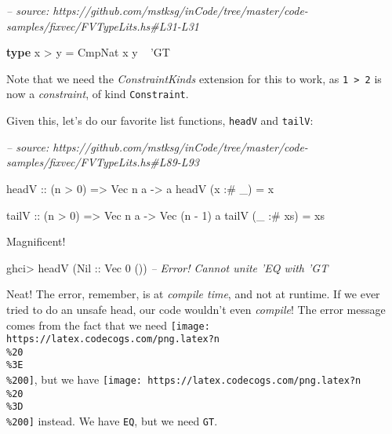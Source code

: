 \documentclass[]{article}
\newenvironment{Shaded}{}{}
\newcommand{\CommentTok}[1]{\textcolor[rgb]{0.38,0.63,0.69}{\textit{#1}}}
\newcommand{\DataTypeTok}[1]{\textcolor[rgb]{0.56,0.13,0.00}{#1}}
\newcommand{\DecValTok}[1]{\textcolor[rgb]{0.25,0.63,0.44}{#1}}
\newcommand{\FunctionTok}[1]{\textcolor[rgb]{0.02,0.16,0.49}{#1}}
\newcommand{\KeywordTok}[1]{\textcolor[rgb]{0.00,0.44,0.13}{\textbf{#1}}}
\newcommand{\NormalTok}[1]{#1}
\newcommand{\OtherTok}[1]{\textcolor[rgb]{0.00,0.44,0.13}{#1}}
\begin{document}
\begin{Shaded}
\begin{Highlighting}[]
\CommentTok{-- source: https://github.com/mstksg/inCode/tree/master/code-samples/fixvec/FVTypeLits.hs#L31-L31}

\KeywordTok{type}\NormalTok{ x }\FunctionTok{>}\NormalTok{ y }\FunctionTok{=} \DataTypeTok{CmpNat}\NormalTok{ x y }\FunctionTok{~}\NormalTok{ '}\DataTypeTok{GT}
\end{Highlighting}
\end{Shaded}

Note that we need the \emph{ConstraintKinds} extension for this to work, as
\texttt{1\ \textgreater{}\ 2} is now a \emph{constraint}, of kind
\texttt{Constraint}.

Given this, let's do our favorite list functions, \texttt{headV} and
\texttt{tailV}:

\begin{Shaded}
\begin{Highlighting}[]
\CommentTok{-- source: https://github.com/mstksg/inCode/tree/master/code-samples/fixvec/FVTypeLits.hs#L89-L93}

\OtherTok{headV ::}\NormalTok{ (n }\FunctionTok{>} \DecValTok{0}\NormalTok{) }\OtherTok{=>} \DataTypeTok{Vec}\NormalTok{ n a }\OtherTok{->}\NormalTok{ a}
\NormalTok{headV (x }\FunctionTok{:#}\NormalTok{ _)  }\FunctionTok{=}\NormalTok{ x}

\OtherTok{tailV ::}\NormalTok{ (n }\FunctionTok{>} \DecValTok{0}\NormalTok{) }\OtherTok{=>} \DataTypeTok{Vec}\NormalTok{ n a }\OtherTok{->} \DataTypeTok{Vec}\NormalTok{ (n }\FunctionTok{-} \DecValTok{1}\NormalTok{) a}
\NormalTok{tailV (_ }\FunctionTok{:#}\NormalTok{ xs) }\FunctionTok{=}\NormalTok{ xs}
\end{Highlighting}
\end{Shaded}

Magnificent!

\begin{Shaded}
\begin{Highlighting}[]
\NormalTok{ghci}\FunctionTok{>}\NormalTok{ headV (}\DataTypeTok{Nil}\OtherTok{ ::} \DataTypeTok{Vec} \DecValTok{0}\NormalTok{ ())}
\CommentTok{-- Error!  Cannot unite 'EQ with 'GT}
\end{Highlighting}
\end{Shaded}

Neat! The error, remember, is at \emph{compile time}, and not at runtime. If we
ever tried to do an unsafe head, our code wouldn't even \emph{compile}! The
error message comes from the fact that we need
\texttt{[image: https://latex.codecogs.com/png.latex?n\\\%20\\\%3E\\\%200]}, but we
have \texttt{[image: https://latex.codecogs.com/png.latex?n\\\%20\\\%3D\\\%200]}
instead. We have \texttt{EQ}, but we need \texttt{GT}.
\end{document}
